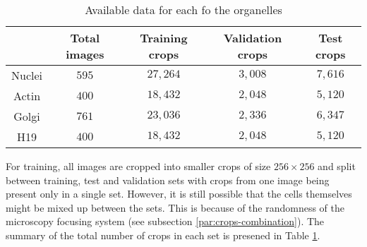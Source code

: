\begin{table}[H]
    \centering
    \caption{Available data for each fo the organelles}
        \begin{adjustbox}{width=0.7\textwidth}
            \begin{tabular}{|c||c|c|c|c|}\hline
                &Total images
                &Training crops
                &Validation crops
                &Test crops
                \\\hline\hline
                Nuclei & $595$ & $27,264$ & $3,008$ & $7,616$\\\hline
                Actin &$400$ & $18,432$ & $2,048$ &$5,120$\\\hline
                Golgi & $761$ & $23,036$ & $2,336$ & $6,347$\\\hline
                H19 & $400$ & $18,432$ & $2,048$ & $5,120$ \\\hline
            \end{tabular}
        \end{adjustbox}
    \label{table:data}
\end{table}

For training, all images are cropped into smaller crops of size $256 \times 256$ and split between training, test and validation sets with crops from one image being present only in a single set. However, it is still possible that the cells themselves might be mixed up between the sets. This is because of the randomness of the microscopy focusing system (see subsection \ref{par:crops-combination}). The summary of the total number of crops in each set is presened in Table \ref{table:data}.

